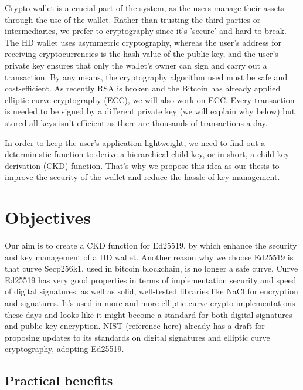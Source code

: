 Crypto wallet is a crucial part of the system, as the users manage their assets through the use of the wallet. Rather than trusting the third parties or intermediaries, we prefer to cryptography since it's 'secure' and hard to break. The HD wallet uses asymmetric cryptography, whereas the user's address for receiving cryptocurrencies is the hash value of the public key, and the user's private key ensures that only the wallet's owner can sign and carry out a transaction. By any means, the cryptography algorithm used must be safe and cost-efficient. As recently RSA is broken and the Bitcoin has already applied elliptic curve cryptography (ECC), we will also work on ECC. Every transaction is needed to be signed by a different private key (we will explain why below) but stored all keys isn't efficient as there are thousands of transactions a day.

In order to keep the user's application lightweight, we need to find out a deterministic function to derive a hierarchical child key, or in short, a child key derivation (CKD) function. That's why we propose this idea as our thesis to improve the security of the wallet and reduce the hassle of key management.

\section{Objectives}


Our aim is to create a CKD function for Ed25519, by which enhance the security and key management of a HD wallet. Another reason why we choose Ed25519 is that curve Secp256k1, used in bitcoin blockchain, is no longer a safe curve. Curve Ed25519 has very good properties in terms of implementation security and speed of digital signatures, as well as solid, well-tested libraries like NaCl for encryption and signatures. It's used in more and more elliptic curve crypto implementations these days and looks like it might become a standard for both digital signatures and public-key encryption. NIST (reference here) already has a draft for proposing updates to its standards on digital signatures and elliptic curve cryptography, adopting Ed25519.

\subsection{Practical benefits}

